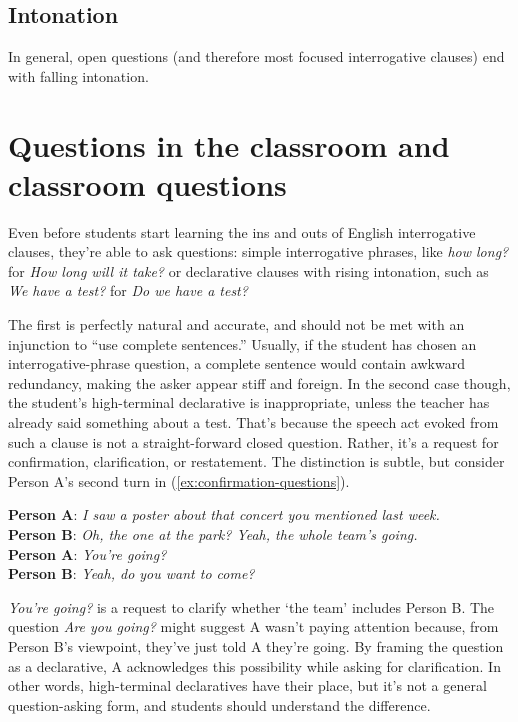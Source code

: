 \subsection{Intonation}

In general, open questions (and therefore most focused interrogative clauses) end with falling intonation.

\section{Questions in the classroom and classroom questions}

Even before students start learning the ins and outs of English interrogative clauses, they're able to ask questions: simple interrogative phrases, like \textit{how long?} for \textit{How long will it take?} or declarative clauses with rising intonation, such as \textit{We have a test?} for \textit{Do we have a test?} 

The first is perfectly natural and accurate, and should not be met with an injunction to ``use complete sentences.'' Usually, if the student has chosen an interrogative-phrase question, a complete sentence would contain awkward redundancy, making the asker appear stiff and foreign. In the second case though, the student's high-terminal declarative is inappropriate, unless the teacher has already said something about a test. That's because the speech act evoked from such a clause is not a straight-forward closed question. Rather, it's a request for confirmation, clarification, or restatement. The distinction is subtle, but consider Person A's second turn in (\ref{ex:confirmation-questions}).

\ea \label{ex:confirmation-questions}
    \textbf{Person A}: \textit{I saw a poster about that concert you mentioned last week.} \\
    \textbf{Person B}: \textit{Oh, the one at the park? Yeah, the whole team's going.} \\
    \textbf{Person A}: \textit{You're going?} \\
    \textbf{Person B}: \textit{Yeah, do you want to come?} \\
\z

 \textit{You're going?} is a request to clarify whether `the team' includes Person B. The question \textit{Are you going?} might suggest A wasn't paying attention because, from Person B's viewpoint, they've just told A they're going. By framing the question as a declarative, A acknowledges this possibility while asking for clarification. In other words, high-terminal declaratives have their place, but it's not a general question-asking form, and students should understand the difference.

